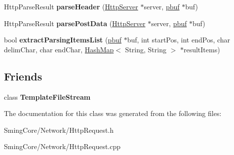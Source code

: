 \begin{DoxyCompactItemize}
\item 
\hypertarget{class_http_request_a9dfe3aabfd7e8c48006e76d7f37d1d83}{}Http\+Parse\+Result {\bfseries parse\+Header} (\hyperlink{class_http_server}{Http\+Server} $\ast$server, \hyperlink{structpbuf}{pbuf} $\ast$buf)\label{class_http_request_a9dfe3aabfd7e8c48006e76d7f37d1d83}

\item 
\hypertarget{class_http_request_acb0876ae302749797b914165d79b30d7}{}Http\+Parse\+Result {\bfseries parse\+Post\+Data} (\hyperlink{class_http_server}{Http\+Server} $\ast$server, \hyperlink{structpbuf}{pbuf} $\ast$buf)\label{class_http_request_acb0876ae302749797b914165d79b30d7}

\item 
\hypertarget{class_http_request_a6be563a3491ca7fcec555c04c94021d6}{}bool {\bfseries extract\+Parsing\+Items\+List} (\hyperlink{structpbuf}{pbuf} $\ast$buf, int start\+Pos, int end\+Pos, char delim\+Char, char end\+Char, \hyperlink{class_hash_map}{Hash\+Map}$<$ String, String $>$ $\ast$result\+Items)\label{class_http_request_a6be563a3491ca7fcec555c04c94021d6}

\end{DoxyCompactItemize}
\subsection*{Friends}
\begin{DoxyCompactItemize}
\item 
\hypertarget{class_http_request_a329df4515861a7be30b085849c292914}{}class {\bfseries Template\+File\+Stream}\label{class_http_request_a329df4515861a7be30b085849c292914}

\end{DoxyCompactItemize}


The documentation for this class was generated from the following files\+:\begin{DoxyCompactItemize}
\item 
Sming\+Core/\+Network/Http\+Request.\+h\item 
Sming\+Core/\+Network/Http\+Request.\+cpp\end{DoxyCompactItemize}

